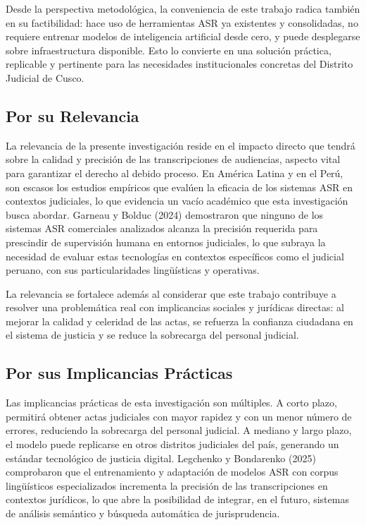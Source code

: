 \documentclass[12pt,a4paper,oneside]{report}
\begin{document}
Desde la perspectiva metodológica, la conveniencia de este trabajo radica también en su factibilidad: hace uso de herramientas ASR ya existentes y consolidadas, no requiere entrenar modelos de inteligencia artificial desde cero, y puede desplegarse sobre infraestructura disponible. Esto lo convierte en una solución práctica, replicable y pertinente para las necesidades institucionales concretas del Distrito Judicial de Cusco.

\subsection{Por su Relevancia}

La relevancia de la presente investigación reside en el impacto directo que tendrá sobre la calidad y precisión de las transcripciones de audiencias, aspecto vital para garantizar el derecho al debido proceso. En América Latina y en el Perú, son escasos los estudios empíricos que evalúen la eficacia de los sistemas ASR en contextos judiciales, lo que evidencia un vacío académico que esta investigación busca abordar. Garneau y Bolduc (2024) demostraron que ninguno de los sistemas ASR comerciales analizados alcanza la precisión requerida para prescindir de supervisión humana en entornos judiciales, lo que subraya la necesidad de evaluar estas tecnologías en contextos específicos como el judicial peruano, con sus particularidades lingüísticas y operativas.

La relevancia se fortalece además al considerar que este trabajo contribuye a resolver una problemática real con implicancias sociales y jurídicas directas: al mejorar la calidad y celeridad de las actas, se refuerza la confianza ciudadana en el sistema de justicia y se reduce la sobrecarga del personal judicial.

\subsection{Por sus Implicancias Prácticas}

Las implicancias prácticas de esta investigación son múltiples. A corto plazo, permitirá obtener actas judiciales con mayor rapidez y con un menor número de errores, reduciendo la sobrecarga del personal judicial. A mediano y largo plazo, el modelo puede replicarse en otros distritos judiciales del país, generando un estándar tecnológico de justicia digital. Legchenko y Bondarenko (2025) comprobaron que el entrenamiento y adaptación de modelos ASR con corpus lingüísticos especializados incrementa la precisión de las transcripciones en contextos jurídicos, lo que abre la posibilidad de integrar, en el futuro, sistemas de análisis semántico y búsqueda automática de jurisprudencia.
\end{document}
